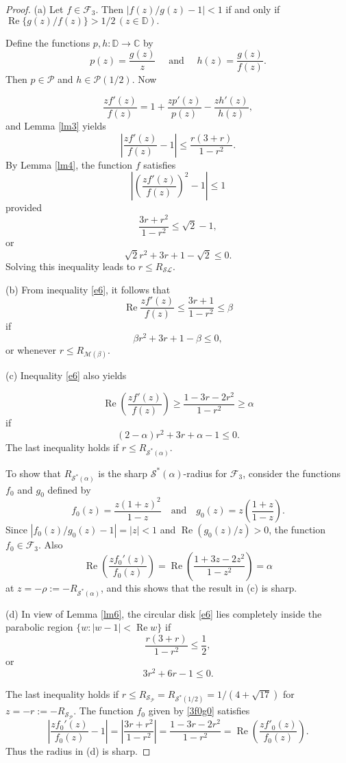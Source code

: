 \documentclass{amsart}
\begin{document}
\begin{proof}
(a) Let $f\in \mathcal{F}_3$. Then
$ \left|f(z)/g(z)-1\right|<1$  if and only if $\operatorname{Re}\{g(z)/f(z)\}>1/2\, (z\in\mathbb{D}).$

Define the functions $p,h:\mathbb{D}\rightarrow \mathbb{C}$ by
\[p(z)=\frac{g(z)}{z}\quad \text{ and } \quad h(z)=\frac{g(z)}{f(z)}.\]
 Then $p\in\mathcal{P} $ and $h \in\mathcal{P}(1/2) $. Now

\begin{equation*}\label{e101}
 \frac{zf'(z)}{f(z)}=1+\frac{zp'(z)}{p(z)}-\frac{zh'(z)}{h(z)},
\end{equation*}
and Lemma \ref{lm3} yields
\begin{equation}\label{e6}
\left|\frac{zf'(z)}{f(z)}-1\right|\leq \frac{r(3+r)}{1-r^2}.
\end{equation}
By Lemma \ref{lm4}, the function $f$ satisfies
 \[ \left|\left(\frac{zf'(z)}{f(z)}\right)^2-1\right|\leq 1  \] provided
\[\frac{3r+r^2}{1-r^2}\leq\sqrt2-1,\] or \[\sqrt2r^2+3r+1-\sqrt2\leq0.\]
Solving this inequality leads to $r \leq R_{\mathcal{SL}}.$

(b) From inequality \eqref{e6}, it follows that
 \[\operatorname{Re}\frac{zf'(z)}{f(z)}\leq\frac{3r+1}{1-r^2}\leq\beta\]
 if
 \[\beta r^2+3r+1-\beta\leq0,\] or  whenever $r\leq R_{\mathcal{M}(\beta)}.$

(c) Inequality \eqref{e6} also yields

\[\operatorname{Re}\left(\frac{zf'(z)}{f(z)}\right)\geq\frac{1-3r-2r^2}{1-r^2} \geq\alpha\]
if
\[(2-\alpha)r^2+3r+\alpha-1\leq0.\] 
The last inequality holds if  $r\leq R_{\mathcal{S}^*(\alpha)}$.

To show that $R_{\mathcal{S}^*(\alpha)}$ is the sharp ${\mathcal{S}^*(\alpha)}$-radius for $\mathcal{F}_3$, consider the functions $f_0$ and $g_0$ defined by
\begin{equation}\label{3f0g0}
f_0(z)= \frac{z(1+z)^2}{1-z}  \quad \text{and} \quad g_0(z)=z \left(\frac{1+z}{1-z}\right).
\end{equation}
Since $ \left| f_0(z)/g_0(z)-1\right|=|z|<1$  and $  \operatorname{Re} \left(g_0(z)/z\right)>0$,  the function
$f_0\in \mathcal{F}_3 $. Also
\[ \operatorname{Re}\left(\frac{zf_0'(z)}{f_0(z)}\right)= \operatorname{Re}\left(\frac{1+3z-2z^2}{1-z^2}\right) =\alpha\] at  $z=-\rho:=-R_{\mathcal{S}^*(\alpha)}$, and
this shows that  the result in (c)  is sharp.

(d) In view of Lemma \ref{lm6}, the  circular disk \eqref{e6} lies completely  inside the parabolic region $\{w:|w-1|<\operatorname{Re} w\}$ if
\[\frac{r(3+r)}{1-r^2}\leq \frac{1}{2},\]
or
\[3r^2+6r-1\leq0.\]

The last inequality  holds if  $r\leq R_{\mathcal{S}_{\mathcal{P}}}=R_{\mathcal{S}^*{( 1/2 )}}= 1/(4+\sqrt{17})$ for $z=-r:=-R_{\mathcal{S}_{\mathcal{P}}}$.
The function $f_0$ given by \eqref{3f0g0} satisfies
\[\left|\frac{zf_0'(z)}{f_0(z)}-1\right|=\left|\frac{3r+r^2}{1-r^2} \right|=\frac{1-3r-2r^2}{1-r^2}=\operatorname{Re}\left(\frac{zf'_0(z)}{f_0(z)}\right).\]
Thus the radius in (d) is sharp.
\end{proof}
\end{document}
